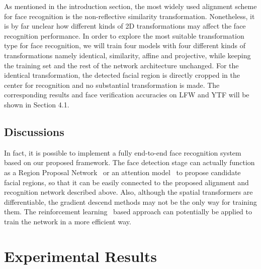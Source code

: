 \documentclass[10pt,twocolumn,letterpaper]{article}
\begin{document}

As mentioned in the introduction section, the most widely used alignment scheme for face recognition is the non-reflective similarity transformation. 
Nonetheless, it is by far unclear how different kinds of 2D transformations may affect the face recognition performance.
In order to explore the most suitable transformation type for face recognition, we will train four models with four different kinds of transformations namely identical, similarity, affine and projective, while keeping the training set and the rest of the network architecture unchanged. 
For the identical transformation, the detected facial region is directly cropped in the center for recognition and no substantial transformation is made.
The corresponding results and face verification accuracies on LFW and YTF will be shown in Section 4.1.
	
\subsection{Discussions}

In fact, it is possible to implement a fully end-to-end face recognition system based on our proposed framework.
The face detection stage can actually function as a Region Proposal Network~\cite{Ren2016Faster} or an attention model~\cite{Xiao2015The} to propose candidate facial regions, so that it can be easily connected to the proposed alignment and recognition network described above.
Also, although the spatial transformers are differentiable, the gradient descend methods may not be the only way for training them. The reinforcement learning~\cite{Caicedo2015Active} based approach can potentially be applied to train the network in a more efficient way.

\section{Experimental Results}
\end{document}
